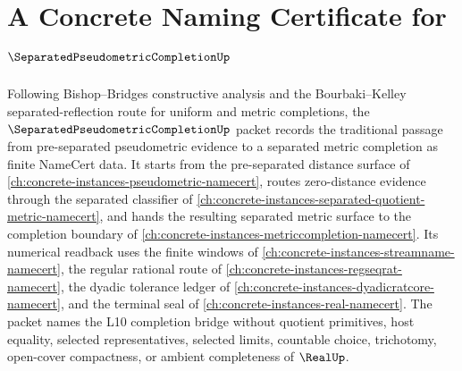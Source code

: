 \chapter{A Concrete Naming Certificate for $\SeparatedPseudometricCompletionUp$}
\label{ch:concrete-instances-separatedpseudometriccompletion-namecert}

Following Bishop--Bridges constructive analysis and the Bourbaki--Kelley separated-reflection route for uniform and metric completions, the $\SeparatedPseudometricCompletionUp$ packet records the traditional passage from pre-separated pseudometric evidence to a separated metric completion as finite NameCert data. It starts from the pre-separated distance surface of \autoref{ch:concrete-instances-pseudometric-namecert}, routes zero-distance evidence through the separated classifier of \autoref{ch:concrete-instances-separated-quotient-metric-namecert}, and hands the resulting separated metric surface to the completion boundary of \autoref{ch:concrete-instances-metriccompletion-namecert}. Its numerical readback uses the finite windows of \autoref{ch:concrete-instances-streamname-namecert}, the regular rational route of \autoref{ch:concrete-instances-regseqrat-namecert}, the dyadic tolerance ledger of \autoref{ch:concrete-instances-dyadicratcore-namecert}, and the terminal seal of \autoref{ch:concrete-instances-real-namecert}. The packet names the L10 completion bridge without quotient primitives, host equality, selected representatives, selected limits, countable choice, trichotomy, open-cover compactness, or ambient completeness of $\RealUp$.

